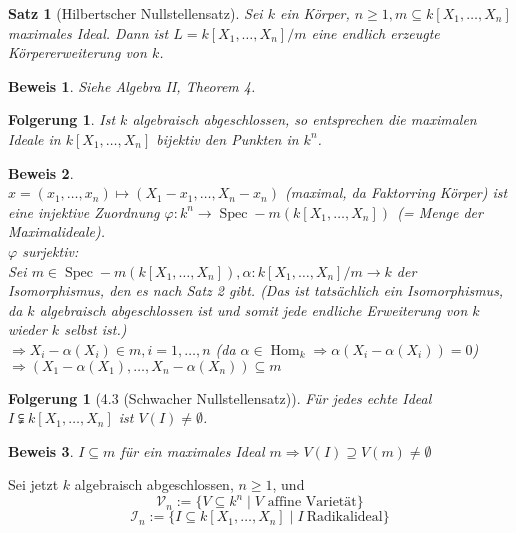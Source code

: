 \documentclass[a4paper,12pt]{report}
\theoremstyle{break}
\newtheorem{Satz}{Satz}
\newtheorem{Folg}[Def]{Folgerung}
\theoremstyle{nonumberbreak}
\theoremstyle{nonumberplain}
\newtheorem{Bew}{Beweis}
\begin{document}
\begin{Satz}[Hilbertscher Nullstellensatz]
Sei  $k$ ein Körper, $n\geq 1, m\subseteq k[X_1,\dots,X_n]$ maximales Ideal. Dann ist $L=k[X_1,\dots,X_n]/m$ eine endlich erzeugte Körpererweiterung von $k$.
\end{Satz}
\begin{Bew} Siehe Algebra II, Theorem 4. \end{Bew}
\begin{Folg}
Ist $k$ algebraisch abgeschlossen, so entsprechen die maximalen Ideale in $k[X_1,\dots,X_n]$ bijektiv den Punkten in $k^n$.
\end{Folg}
\begin{Bew}~\\
$x=(x_1,\dots,x_n)\mapsto (X_1-x_1,\dots,X_n-x_n)$ (maximal, da Faktorring Körper) ist eine injektive Zuordnung $\varphi: k^n \rightarrow\operatorname{Spec}-m(k[X_1,\dots,X_n])~~$(= Menge der Maximalideale).\\
$\varphi$ surjektiv:\\
Sei $m\in\operatorname{Spec}-m (k[X_1,\dots,X_n]), \alpha: k[X_1,\dots,X_n]/m \rightarrow k$ der Isomorphismus, den es nach Satz 2 gibt. (Das ist tatsächlich ein Isomorphismus, da $k$ algebraisch abgeschlossen ist und somit jede endliche Erweiterung von $k$ wieder $k$ selbst ist.)\\
$\Rightarrow X_i - \alpha(X_i)\in m, i= 1,\dots,n$ (da $\alpha\in \operatorname{Hom}_k\Rightarrow \alpha(X_i-\alpha(X_i))=0$)\\
$\Rightarrow (X_1-\alpha(X_1),\dots,X_n-\alpha(X_n)) \subseteq m$
\end{Bew}
\begin{Folg}[4.3 (Schwacher Nullstellensatz)]
Für jedes echte Ideal $I\subsetneqq k[X_1,\dots,X_n]$ ist $V(I)\neq \emptyset$.
\end{Folg}
\begin{Bew}
$I\subseteq m$ für ein maximales Ideal $m \Rightarrow V(I) \supseteq V(m) \neq \emptyset$
\end{Bew}
Sei jetzt  $k$ algebraisch abgeschlossen, $n\geq 1$, und
$$\mathcal{V}_n:= \{V\subseteq k^n\mid V \textrm{~affine~Varietät}\}$$
$$\mathcal{I}_n:=\{I\subseteq k[X_1,\dots,X_n]\mid I ~ \textrm{Radikalideal}\}$$
\end{document}
